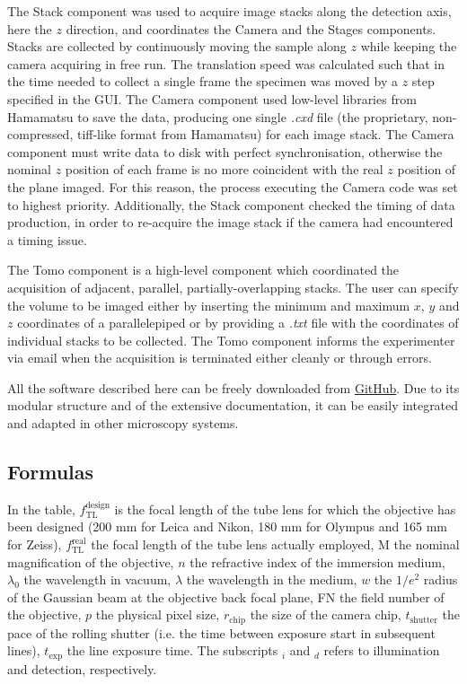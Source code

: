 \documentclass[12pt]{spieman}  %
\begin{document}
\begin{spacing}{2}
The Stack component was used to acquire image stacks along the detection axis, here the $z$ direction, and coordinates the Camera and the Stages components. Stacks are collected by continuously moving the sample along $z$ while keeping the camera acquiring in free run. The translation speed was calculated such that in the time needed to collect a single frame the specimen was moved by a $z$ step specified in the GUI. The Camera component used low-level libraries from Hamamatsu to save the data, producing one single \emph{.cxd} file (the proprietary, non-compressed, tiff-like format from Hamamatsu) for each image stack. The Camera component must write data to disk with perfect synchronisation, otherwise the nominal $z$ position of each frame is no more coincident with the real $z$ position of the plane imaged. For this reason, the process executing the Camera code was set to highest priority. Additionally, the Stack component checked the timing of data production, in order to re-acquire the image stack if the camera had encountered a timing issue. 

The Tomo component is a high-level component which coordinated the acquisition of adjacent, parallel, partially-overlapping stacks. The user can specify the volume to be imaged either by inserting the minimum and maximum $x$, $y$ and $z$ coordinates of a parallelepiped or by providing a \textit{.txt} file with the coordinates of individual stacks to be collected. The Tomo component informs the experimenter via email when the acquisition is terminated either cleanly or through errors.

All the software described here can be freely downloaded from \href{https://github.com/marcelvanthoff/Giorgio}{GitHub}. Due to its modular structure and of the extensive documentation, it can be easily integrated and adapted in other microscopy systems.

\subsection{Formulas}

In the table, $f_{\text{TL}}^{\text{design}}$ is the focal length of the tube lens for which the objective has been designed (200 mm for Leica and Nikon, 180 mm for Olympus and 165 mm for Zeiss), $f_{\text{TL}}^{\text{real}}$ the focal length of the tube lens actually employed, $\text{M}$ the nominal magnification of the objective, $n$ the refractive index of the immersion medium, $\lambda_0$ the wavelength in vacuum, $\lambda$ the wavelength in the medium, $w$ the $1/e^2$ radius of the Gaussian beam at the objective back focal plane, FN the field number of the objective, $p$ the physical pixel size, $r_{\text{chip}}$ the size of the camera chip, $t_{\text{shutter}}$ the pace of the rolling shutter (i.e. the time between exposure start in subsequent lines), $ t_{\text{exp}}$ the line exposure time. The subscripts $_i$ and $_d$ refers to illumination and detection, respectively.


\end{spacing}
\end{document}
